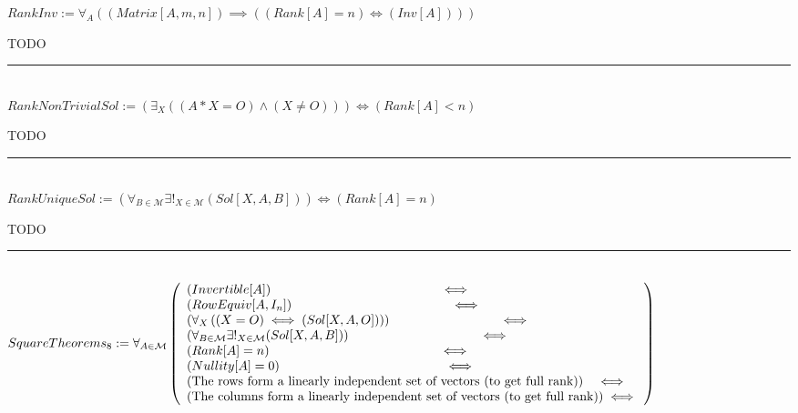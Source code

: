\documentclass{book}
\newcommand{\abr}{:=}
\newcommand{\pr}[1]{\left(#1\right)}
\begin{document}
$RankInv \abr \forall_{A}\pr{(Matrix[A, m, n]) \implies \pr{(Rank[A] = n) \iff (Inv[A])}}$
\begin{enumerate}
  \lit TODO
\end{enumerate} \vspace{.75mm} \hrule \vspace{.75mm} \ \\ 

$RankNonTrivialSol \abr \pr{\exists_{X}\pr{(A * X = O) \land (X \neq O)}} \iff (Rank[A] < n)$
\begin{enumerate}
  \lit TODO
\end{enumerate} \vspace{.75mm} \hrule \vspace{.75mm} \ \\ 

$RankUniqueSol \abr \pr{\forall_{B \in \mathcal{M}} \exists!_{X \in \mathcal{M}}(Sol[X, A, B])} \iff (Rank[A] = n)$
\begin{enumerate}
  \lit TODO
\end{enumerate} \vspace{.75mm} \hrule \vspace{.75mm} \ \\ 

$SquareTheorems_8 \abr \forall_{A \in \mathcal{M}}\left(\begin{array}{ll}
  (Invertible[A]) \hfill \iff \hfill \\
  (RowEquiv[A, I_n]) \hfill \iff \hfill \\
  \pr{\forall_{X}\pr{(X = O) \iff (Sol[X, A, O])}} \hfill \iff \hfill \\
  \pr{\forall_{B \in \mathcal{M}} \exists!_{X \in \mathcal{M}}(Sol[X, A, B])} \hfill \iff \hfill \\
  (Rank[A] = n) \hfill \iff \hfill \\
  (Nullity[A] = 0) \hfill \iff \hfill \\
  \pr{\text{The rows form a linearly independent set of vectors (to get full rank)}} \hfill \iff \hfill \\
  \pr{\text{The columns form a linearly independent set of vectors (to get full rank)}} \hfill \iff \hfill \\
\end{array}\right)$ \\
\end{document}
